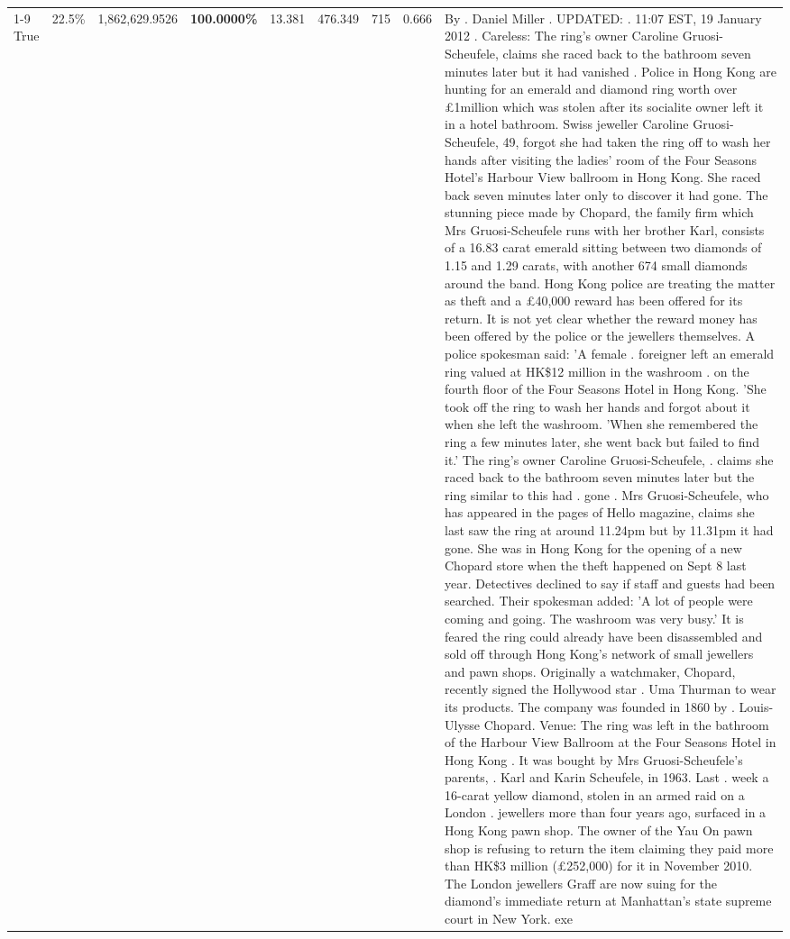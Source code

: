 \begin{table}[H]
\begin{tabular}{lllrlllll}
\cline{1-9}
True & 22.5\% & 1,862,629.9526 & \bfseries \color{red} 100.0000\% & 13.381 & 476.349 & 715 & 0.666 & By . Daniel Miller . UPDATED: . 11:07 EST, 19 January 2012 . Careless: The ring's owner Caroline Gruosi-Scheufele, claims she raced back to the bathroom seven minutes later but it had vanished . Police in Hong Kong are hunting for an emerald and diamond ring worth over £1million which was stolen after its socialite owner left it in a hotel bathroom. Swiss jeweller Caroline Gruosi-Scheufele, 49, forgot she had taken the ring off to wash her hands after visiting the ladies' room of the Four Seasons Hotel's Harbour View ballroom in Hong Kong. She raced back seven minutes later only to discover it had gone. The stunning piece made by Chopard, the family firm which Mrs Gruosi-Scheufele runs with her brother Karl, consists of a 16.83 carat emerald sitting between two diamonds of 1.15 and 1.29 carats, with another 674 small diamonds around the band. Hong Kong police are treating the matter as theft and a £40,000 reward has been offered for its return. It is not yet clear whether the reward money has been offered by the police or the jewellers themselves. A police spokesman said: 'A female . foreigner left an emerald ring valued at HK\$12 million in the washroom . on the fourth floor of the Four Seasons Hotel in Hong Kong. 'She took off the ring to wash her hands and forgot about it when she left the washroom. 'When she remembered the ring a few minutes later, she went back but failed to find it.' The ring's owner Caroline Gruosi-Scheufele, . claims she raced back to the bathroom seven minutes later but the ring similar to this had . gone . Mrs Gruosi-Scheufele, who has appeared in the pages of Hello magazine, claims she last saw the ring at around 11.24pm but by 11.31pm it had gone. She was in Hong Kong for the opening of a new Chopard store when the theft happened on Sept 8 last year. Detectives declined to say if staff and guests had been searched. Their spokesman added: 'A lot of people were coming and going. The washroom was very busy.' It is feared the ring could already have been disassembled and sold off through Hong Kong's network of small jewellers and pawn shops. Originally a watchmaker, Chopard, recently signed the Hollywood star . Uma Thurman to wear its products. The company was founded in 1860 by . Louis-Ulysse Chopard. Venue: The ring was left in the bathroom of the Harbour View Ballroom at the Four Seasons Hotel in Hong Kong . It was bought by Mrs Gruosi-Scheufele's  parents, . Karl and Karin Scheufele, in 1963. Last . week a 16-carat yellow diamond, stolen in an armed raid on a London . jewellers more than four years ago, surfaced in a Hong Kong pawn shop. The owner of the Yau On pawn shop is refusing to return the item claiming they paid more than HK\$3 million (£252,000) for it in November 2010. The London jewellers Graff are now suing for the diamond’s immediate return at Manhattan’s state supreme court in New York. exe \\

\end{tabular}
\end{table}
